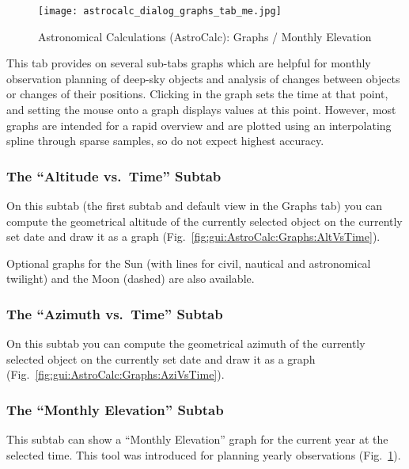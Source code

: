 \begin{figure}[p]
\centering\texttt{[image: astrocalc\_dialog\_graphs\_tab\_me.jpg]}
\caption{Astronomical Calculations (AstroCalc): Graphs / Monthly Elevation}
\label{fig:gui:AstroCalc:Graphs:ME}
\end{figure}


This tab provides on several sub-tabs
 graphs which are helpful for monthly observation
planning of deep-sky objects and analysis of changes between objects
or changes of their positions. Clicking  in the
graph sets the time at that point, and setting the mouse onto a graph
displays values at this point. However, most graphs are intended for a
rapid overview and are plotted using an interpolating spline through sparse samples,
so do not expect highest accuracy. 

\subsubsection{The ``Altitude vs.\ Time'' Subtab}
\label{sec:gui:AstroCalc:Graphs:AltVsTime}
  
On this subtab (the first subtab and default view in the Graphs tab) you can compute the geometrical altitude of the currently selected object 
on the currently set date and draw it as a graph (Fig.~\ref{fig:gui:AstroCalc:Graphs:AltVsTime}).

Optional graphs for the Sun (with lines for civil, nautical and astronomical twilight) and the Moon (dashed) are also available.

\subsubsection{The ``Azimuth vs.\ Time'' Subtab}
\label{sec:gui:AstroCalc:Graphs:AziVsTime}
  
On this subtab  you can compute the geometrical azimuth of the currently selected object 
on the currently set date and draw it as a graph (Fig.~\ref{fig:gui:AstroCalc:Graphs:AziVsTime}).
    
\subsubsection{The ``Monthly Elevation'' Subtab}
\label{sec:gui:AstroCalc:Graphs:ME}

This subtab  can show a ``Monthly Elevation'' graph for the current year at the selected time.
This tool was introduced for planning yearly observations (Fig.~\ref{fig:gui:AstroCalc:Graphs:ME}).

